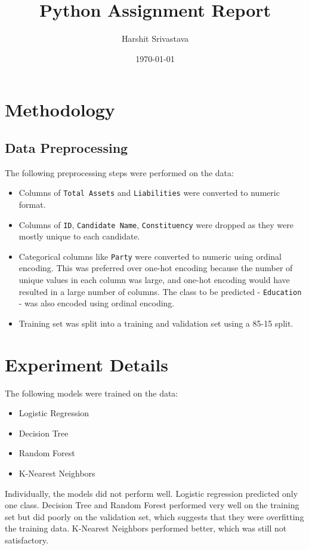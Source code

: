 \documentclass{article}
\title{Python Assignment Report}
\author{Harshit Srivastava}
\date{\today}
\begin{document}
\maketitle

\section{Methodology}
\subsection{Data Preprocessing}
The following preprocessing steps were performed on the data:
\begin{itemize}
    \item Columns of \texttt{Total Assets} and \texttt{Liabilities} were converted to numeric format.
    \item Columns of \texttt{ID}, \texttt{Candidate Name}, \texttt{Constituency} were dropped as they were mostly unique to each candidate.
    \item Categorical columns like \texttt{Party} were converted to numeric using ordinal encoding. This was preferred over one-hot encoding because the number of unique values in each column was large, and one-hot encoding would have resulted in a large number of columns. The class to be predicted - \texttt{Education} - was also encoded using ordinal encoding.
    \item Training set was split into a training and validation set using a 85-15 split.
    \end{itemize}

\section{Experiment Details}
The following models were trained on the data:
\begin{itemize}
    \item Logistic Regression
    \item Decision Tree
    \item Random Forest
    \item K-Nearest Neighbors
\end{itemize}
Individually, the models did not perform well. Logistic regression predicted only one class. Decision Tree and Random Forest performed very well on the training set but did poorly on the validation set, which suggests that they were overfitting the training data. K-Nearest Neighbors performed better, which was still not satisfactory.
\end{document}
